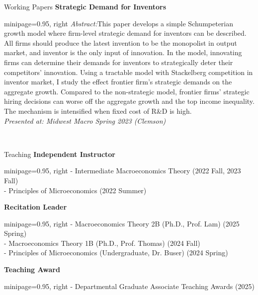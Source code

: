 \documentclass{cv} %
\begin{document}
\begin{rSection}{Working Papers}
\medskip
{\bf Strategic Demand for Inventors} \\
	 \begin{adjustbox}{minipage=0.95\textwidth, right}
		\vspace{0.3em} {\emph{Abstract:}This paper develops a simple Schumpeterian growth model where firm-level strategic demand for inventors can be described.  All firms should produce the latest invention to be the monopolist in output market, and inventor is the only input of innovation.  In the model, innovating firms can determine their demands for inventors to strategically deter their competitors' innovation.  Using a tractable model with Stackelberg competition in inventor market,  I study the effect frontier firm's strategic demands on the aggregate growth.  Compared to the non-strategic model,  frontier firms' strategic hiring decisions can worse off the aggregate growth and the top income inequality.  The mechanism is intensified when fixed cost of R\&D is high.} \\
		\emph{Presented at: Midwest Macro Spring 2023 (Clemson)}
	\end{adjustbox}\\

\end{rSection}
\bigskip

\begin{rSection}{Teaching}
	{\bf Independent Instructor} \\
	\begin{adjustbox}{minipage=0.95\textwidth, right}
		\vspace{0.3em} 
		- Intermediate Macroeconomics Theory (2022 Fall, 2023 Fall) \\
		- Principles of Microeconomics (2022 Summer) 
	\end{adjustbox}

	\medskip
	{\bf Recitation Leader} \\
	\begin{adjustbox}{minipage=0.95\textwidth, right}
		\vspace{0.3em} 
		- Macroeconomics Theory 2B (Ph.D., Prof. Lam) (2025 Spring) \\
		- Macroeconomics Theory 1B (Ph.D., Prof. Thomas) (2024 Fall) \\
		- Principles of Microeconomics (Undergraduate, Dr. Buser) (2024 Spring)
	\end{adjustbox}

	\medskip
	{\bf Teaching Award} \\
	\begin{adjustbox}{minipage=0.95\textwidth, right}
		\vspace{0.3em} 
		- Departmental Graduate Associate Teaching Awards (2025)
	\end{adjustbox}
\end{rSection}
\end{document}
